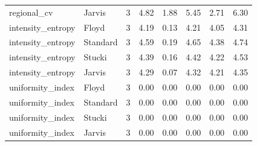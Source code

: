 \begin{tabular}{llrlllll}
regional_cv & Jarvis & 3 & 4.82 & 1.88 & 5.45 & 2.71 & 6.30 \\
intensity_entropy & Floyd & 3 & 4.19 & 0.13 & 4.21 & 4.05 & 4.31 \\
intensity_entropy & Standard & 3 & 4.59 & 0.19 & 4.65 & 4.38 & 4.74 \\
intensity_entropy & Stucki & 3 & 4.39 & 0.16 & 4.42 & 4.22 & 4.53 \\
intensity_entropy & Jarvis & 3 & 4.29 & 0.07 & 4.32 & 4.21 & 4.35 \\
uniformity_index & Floyd & 3 & 0.00 & 0.00 & 0.00 & 0.00 & 0.00 \\
uniformity_index & Standard & 3 & 0.00 & 0.00 & 0.00 & 0.00 & 0.00 \\
uniformity_index & Stucki & 3 & 0.00 & 0.00 & 0.00 & 0.00 & 0.00 \\
uniformity_index & Jarvis & 3 & 0.00 & 0.00 & 0.00 & 0.00 & 0.00 \\
\bottomrule
\end{tabular}
